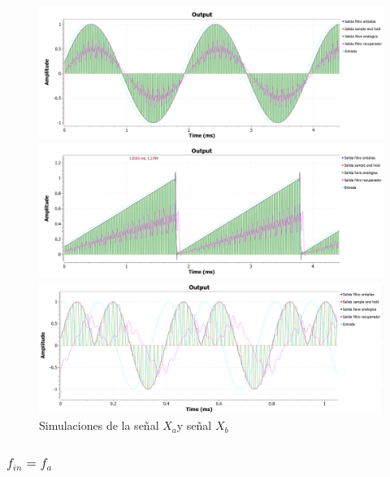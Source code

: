 \documentclass[../../ASSD_TP1_G7.tex]{subfiles}
\begin{document}
\begin{figure}[H]

\begin{centering}
\includegraphics[scale=0.5]{Imagenes/simulacion_llave_seno_b1.PNG}
\par\end{centering}
\begin{centering}
\includegraphics[scale=0.5]{Imagenes/simulacion_llave_diente_b1.PNG}
\par\end{centering}
\begin{centering}
\includegraphics[scale=0.5]{Imagenes/simulacion_llave_senoraro_b1.PNG}\caption{Simulaciones de la señal $X_{a}$y señal $X_{b}$ }
\par\end{centering}
\end{figure}


\subsubsection{$f_{in}=f_{a}$}
\end{document}
